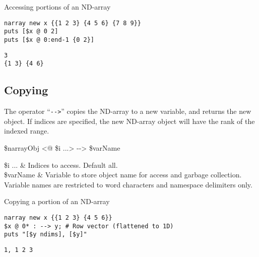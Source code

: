 \begin{example}{Accessing portions of an ND-array}
\begin{lstlisting}
narray new x {{1 2 3} {4 5 6} {7 8 9}}
puts [$x @ 0 2]
puts [$x @ 0:end-1 {0 2}]
\end{lstlisting}
\tcblower
\begin{lstlisting}
3
{1 3} {4 6}
\end{lstlisting}
\end{example}

\subsection{Copying}
The operator ``\texttt{-{}->}'' copies the ND-array to a new variable, and returns the new object.
If indices are specified, the new ND-array object will have the rank of the indexed range.
\begin{syntax}
 \$narrayObj <@ \$i ...> -{}-> \$varName
\end{syntax}
\begin{args}
\$i ... & Indices to access. Default all. \\
\$varName & Variable to store object name for access and garbage collection. 
Variable names are restricted to word characters and namespace delimiters only.
\end{args}

\begin{example}{Copying a portion of an ND-array}
\begin{lstlisting}
narray new x {{1 2 3} {4 5 6}}
$x @ 0* : --> y; # Row vector (flattened to 1D)
puts "[$y ndims], [$y]"
\end{lstlisting}
\tcblower
\begin{lstlisting}
1, 1 2 3
\end{lstlisting}
\end{example}
\clearpage
